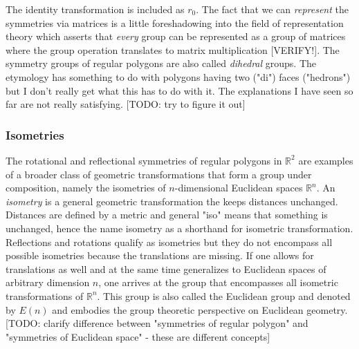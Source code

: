 The identity transformation is included as $r_0$. The fact that we can \emph{represent} the symmetries via matrices is a little foreshadowing into the field of representation theory which asserts that \emph{every} group can be represented as a group of matrices where the group operation translates to matrix multiplication [VERIFY!]. The symmetry groups of regular polygons are also called \emph{dihedral} groups. The etymology has something to do with polygons having two ("di") faces ("hedrons") but I don't really get what this has to do with it. The explanations I have seen so far are not really satisfying. [TODO: try to figure it out]





\subsubsection{Isometries}
The rotational and reflectional symmetries of regular polygons in $\mathbb{R}^2$ are examples of a broader class of geometric transformations that form a group under composition, namely the isometries of $n$-dimensional Euclidean spaces $\mathbb{R}^n$. An \emph{isometry} is a general geometric transformation the keeps distances unchanged. Distances are defined by a metric and general "iso" means that something is unchanged, hence the name isometry as a shorthand for isometric transformation. Reflections and rotations qualify as isometries but they do not encompass all possible isometries because the translations are missing. If one allows for translations as well and at the same time generalizes to Euclidean spaces of arbitrary dimension $n$, one arrives at the group that encompasses all isometric transformations of $\mathbb{R}^n$. This group is also called the Euclidean group and denoted by $E(n)$ and embodies the group theoretic perspective on Euclidean geometry. [TODO: clarify difference between "symmetries of regular polygon" and "symmetries of Euclidean space" - these are different concepts]

